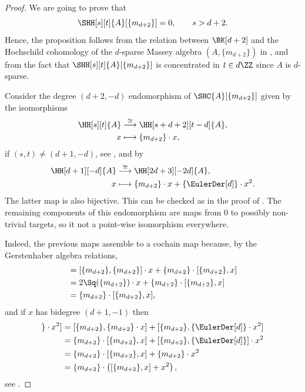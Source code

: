 \documentclass[a4paper]{amsart}
\begin{document}
\begin{proof}
  We are going to prove that 
  \[\SHH[s][t]{A}[\{m_{d+2}\}]=0,\qquad s> d+2.\]
  Hence, the proposition follows from the relation between $\BK[d+2]$ and the Hochschild cohomology of the $d$-sparse Massey algebra $(A,\{m_{d+2}\})$ in , and from the fact that $\SHH[s][t]{A}[\{m_{d+2}\}]$ is concentrated in $t\in d\ZZ$ since $A$ is $d$-sparse.

  Consider the degree $(d+2,-d)$ endomorphism of $\SHC{A}[\{m_{d+2}\}]$ given by the isomorphisms
  \begin{align*}
    \HH[s][t]{A}&\stackrel{\cong}{\longrightarrow}\HH[s+d+2][t-d]{A},\\
    x&\longmapsto \{m_{d+2}\}\cdot x,
  \end{align*}
  if $(s,t)\neq (d+1,-d)$,
  see , and by
  \begin{align*}
    \HH[d+1][-d]{A}&\stackrel{\cong}{\longrightarrow}\HH[2d+3][-2d]{A},\\
    x&\longmapsto \{m_{d+2}\}\cdot x+\{\EulerDer[d]\}\cdot x^2.
  \end{align*}
  The latter map is also bijective. This can be checked as in the proof of \cite[Thm.~9.1]{Mur22}. The remaining components of this endomorphism are maps from $0$ to possibly non-trivial targets, so it not a point-wise isomorphism everywhere.
  
  Indeed, the previous maps assemble to a cochain map because, by the Gerstenhaber algebra relations,
  \begin{align*}
    [\{m_{d+2}\},\{m_{d+2}\}\cdot x]&=[\{m_{d+2}\},\{m_{d+2}\}]\cdot x+\{m_{d+2}\}\cdot [\{m_{d+2}\},x]\\
    &=2\Sq(\{m_{d+2}\})\cdot x+\{m_{d+2}\}\cdot [\{m_{d+2}\},x]\\
    &=\{m_{d+2}\}\cdot [\{m_{d+2}\},x],
  \end{align*}
  and if $x$ has bidegree $(d+1,-1)$ then
  \begin{align*}
    [\{m_{d+2}\},\{m_{d+2}\}\cdot x+\{\EulerDer[d]\}\cdot x^2]&=
    [\{m_{d+2}\},\{m_{d+2}\}\cdot x]+[\{m_{d+2}\},\{\EulerDer[d]\}\cdot x^2]\\
    &=\{m_{d+2}\}\cdot [\{m_{d+2}\},x]+[\{m_{d+2}\},\{\EulerDer[d]\}]\cdot x^2\\
    &=\{m_{d+2}\}\cdot [\{m_{d+2}\},x]+\{m_{d+2}\}\cdot x^2\\
    &=\{m_{d+2}\}\cdot \left([\{m_{d+2}\},x]+x^2\right),
  \end{align*}
  see .


\end{proof}
\end{document}
